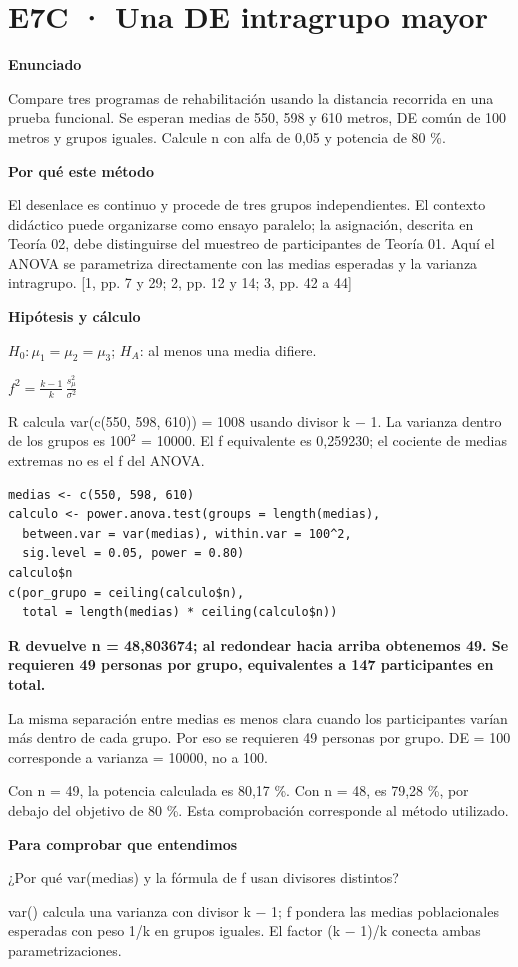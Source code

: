 \documentclass[10pt,a4paper]{article}
\newcommand{\etiqueta}[1]{\par{\bfseries\color{Blue}#1}\par}
\newcommand{\cajares}[1]{\par\colorbox{Pale}{\parbox{\dimexpr\linewidth-2\fboxsep}{\vspace{4pt}\textbf{\color{Navy}#1}\vspace{4pt}}}\par}
\begin{document}
\section*{E7C · Una DE intragrupo mayor}
\etiqueta{Enunciado}
Compare tres programas de rehabilitación usando la distancia recorrida en una prueba funcional. Se esperan medias de 550, 598 y 610 metros, DE común de 100 metros y grupos iguales. Calcule n con alfa de 0,05 y potencia de 80 \%.
\etiqueta{Por qué este método}
El desenlace es continuo y procede de tres grupos independientes. El contexto didáctico puede organizarse como ensayo paralelo; la asignación, descrita en Teoría 02, debe distinguirse del muestreo de participantes de Teoría 01. Aquí el ANOVA se parametriza directamente con las medias esperadas y la varianza intragrupo. [1, pp. 7 y 29; 2, pp. 12 y 14; 3, pp. 42 a 44]
\etiqueta{Hipótesis y cálculo}
$H_0:\mu_1=\mu_2=\mu_3$; $H_A$: al menos una media difiere.

$f^2=\frac{k-1}{k}\,\frac{s_{\mu}^2}{\sigma^2}$

R calcula var(c(550, 598, 610)) = 1008 usando divisor k \ensuremath{-} 1. La varianza dentro de los grupos es 100\ensuremath{^2} = 10000. El f equivalente es 0,259230; el cociente de medias extremas no es el f del ANOVA.
\begin{Verbatim}
medias <- c(550, 598, 610)
calculo <- power.anova.test(groups = length(medias),
  between.var = var(medias), within.var = 100^2,
  sig.level = 0.05, power = 0.80)
calculo$n
c(por_grupo = ceiling(calculo$n),
  total = length(medias) * ceiling(calculo$n))
\end{Verbatim}
\cajares{R devuelve n = 48,803674; al redondear hacia arriba obtenemos 49. Se requieren 49 personas por grupo, equivalentes a 147 participantes en total.}
La misma separación entre medias es menos clara cuando los participantes varían más dentro de cada grupo. Por eso se requieren 49 personas por grupo. DE = 100 corresponde a varianza = 10000, no a 100.

{\small\color{Gray}Con n = 49, la potencia calculada es 80,17 \%. Con n = 48, es 79,28 \%, por debajo del objetivo de 80 \%. Esta comprobación corresponde al método utilizado.}
\etiqueta{Para comprobar que entendimos}
¿Por qué var(medias) y la fórmula de f usan divisores distintos?

{\small var() calcula una varianza con divisor k \ensuremath{-} 1; f pondera las medias poblacionales esperadas con peso 1/k en grupos iguales. El factor (k \ensuremath{-} 1)/k conecta ambas parametrizaciones.}
\clearpage
\end{document}
